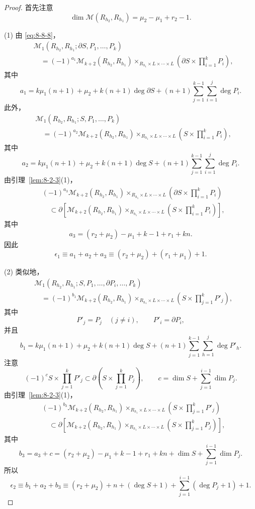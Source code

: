 \begin{proof}
首先注意
\[
 \dim\mathcal M(R_{h_2},R_{h_1})
 =\mu_2-\mu_1+r_2-1.
\]

\textup{(1)}
由 \eqref{eq:8-8-8}，
\[
\begin{aligned}
 &\mathcal M_1
 (R_{h_2},R_{h_1};\partial S,P_1,\ldots,P_k)\\
 &\quad=
 (-1)^{a_1}
 \mathcal M_{k+2}(R_{h_2},R_{h_1})
 \mathop{\times}_{R_{h_1}\times L\times\cdots\times L}
 \left(\partial S\times\prod_{i=1}^{k}P_i\right),
\end{aligned}
\]
其中
\[
 a_1=
 k\mu_1(n+1)+\mu_2+k(n+1)\deg\partial S
 +(n+1)\sum_{j=1}^{k-1}\sum_{i=1}^{j}\deg P_i.
\]
此外，
\[
\begin{aligned}
 &\mathcal M_1
 (R_{h_2},R_{h_1};S,P_1,\ldots,P_k)\\
 &\quad=
 (-1)^{a_2}
 \mathcal M_{k+2}(R_{h_2},R_{h_1})
 \mathop{\times}_{R_{h_1}\times L\times\cdots\times L}
 \left(S\times\prod_{i=1}^{k}P_i\right),
\end{aligned}
\]
其中
\[
 a_2=
 k\mu_1(n+1)+\mu_2+k(n+1)\deg S
 +(n+1)\sum_{j=1}^{k-1}\sum_{i=1}^{j}\deg P_i.
\]
由引理~\ref{lem:8-2-3}(1)，
\[
\begin{aligned}
 &(-1)^{a_3}
 \mathcal M_{k+2}(R_{h_2},R_{h_1})
 \mathop{\times}_{R_{h_1}\times L\times\cdots\times L}
 \left(\partial S\times\prod_{i=1}^{k}P_i\right)\\
 &\quad\subset
 \partial\left[
 \mathcal M_{k+2}(R_{h_2},R_{h_1})
 \mathop{\times}_{R_{h_1}\times L\times\cdots\times L}
 \left(S\times\prod_{i=1}^{k}P_i\right)
 \right],
\end{aligned}
\]
其中
\[
 a_3=(r_2+\mu_2)-\mu_1+k-1+r_1+kn.
\]
因此
\[
 \epsilon_1\equiv a_1+a_2+a_3
 \equiv(r_2+\mu_2)+(r_1+\mu_1)+1.
\]

\textup{(2)}
类似地，
\[
\begin{aligned}
 &\mathcal M_1
 (R_{h_2},R_{h_1};
 S,P_1,\ldots,\partial P_i,\ldots,P_k)\\
 &\quad=
 (-1)^{b_1}
 \mathcal M_{k+2}(R_{h_2},R_{h_1})
 \mathop{\times}_{R_{h_1}\times L\times\cdots\times L}
 \left(S\times\prod_{j=1}^{k}P'_j\right),
\end{aligned}
\]
其中
\[
 P'_j=P_j\quad(j\ne i),\qquad P'_i=\partial P_i,
\]
并且
\[
 b_1=
 k\mu_1(n+1)+\mu_2+k(n+1)\deg S
 +(n+1)\sum_{j=1}^{k-1}\sum_{h=1}^{j}\deg P'_h.
\]
注意
\[
 (-1)^cS\times\prod_{j=1}^{k}P'_j
 \subset
 \partial\left(S\times\prod_{j=1}^{k}P_j\right),
\qquad
 c=\dim S+\sum_{j=1}^{i-1}\dim P_j.
\]
由引理~\ref{lem:8-2-3}(1)，
\[
\begin{aligned}
 &(-1)^{b_3}
 \mathcal M_{k+2}(R_{h_2},R_{h_1})
 \mathop{\times}_{R_{h_1}\times L\times\cdots\times L}
 \left(S\times\prod_{j=1}^{k}P'_j\right)\\
 &\quad\subset
 \partial\left[
 \mathcal M_{k+2}(R_{h_2},R_{h_1})
 \mathop{\times}_{R_{h_1}\times L\times\cdots\times L}
 \left(S\times\prod_{j=1}^{k}P_j\right)
 \right],
\end{aligned}
\]
其中
\[
 b_3=a_3+c
 =(r_2+\mu_2)-\mu_1+k-1+r_1+kn
 +\dim S+\sum_{j=1}^{i-1}\dim P_j.
\]
所以
\[
 \epsilon_2\equiv b_1+a_2+b_3
 \equiv
 (r_2+\mu_2)+n+(\deg S+1)
 +\sum_{j=1}^{i-1}(\deg P_j+1)+1.
\]


\end{proof}

